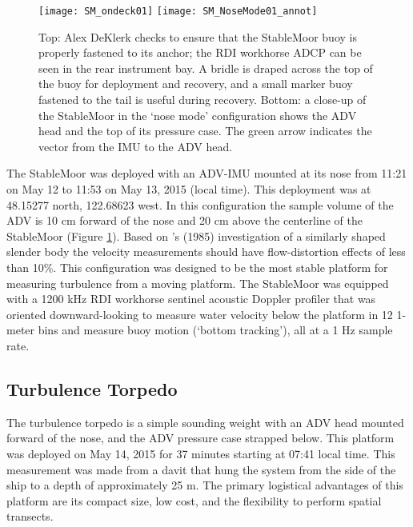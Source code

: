 \begin{figure}[t]
  \centering
  \texttt{[image: SM\_ondeck01]}
  \texttt{[image: SM\_NoseMode01\_annot]}
  \caption{Top: Alex DeKlerk checks to ensure that the StableMoor buoy is properly fastened to its anchor; the RDI workhorse ADCP can be seen in the rear instrument bay. A bridle is draped across the top of the buoy for deployment and recovery, and a small marker buoy fastened to the tail is useful during recovery.  Bottom: a close-up of the StableMoor in the `nose mode' configuration shows the ADV head and the top of its pressure case. The green arrow indicates the vector from the IMU to the ADV head. 
}
  \label{fig:SM}
\end{figure}

The StableMoor was deployed with an ADV-IMU mounted at its nose from 11:21 on May 12 to 11:53 on May 13, 2015 (local time). This deployment was at 48.15277 north, 122.68623 west. In this configuration the sample volume of the ADV is 10 cm forward of the nose and 20 cm above the centerline of the StableMoor (Figure \ref{fig:SM}). Based on \citeauthor{Wyngaard++1985}'s (1985) investigation of a similarly shaped slender body the velocity measurements should have flow-distortion effects of less than 10\%. This configuration was designed to be the most stable platform for measuring turbulence from a moving platform. The StableMoor was equipped with a 1200 kHz RDI workhorse sentinel acoustic Doppler profiler that was oriented downward-looking to measure water velocity below the platform in 12 1-meter bins and measure buoy motion (`bottom tracking'), all at a 1 Hz sample rate. 

\subsection{Turbulence Torpedo}

The turbulence torpedo is a simple sounding weight with an ADV head mounted forward of the nose, and the ADV pressure case strapped below. This platform was deployed on May 14, 2015 for 37 minutes starting at 07:41 local time.  This measurement was made from a davit that hung the system from the side of the ship to a depth of approximately 25 m. The primary logistical advantages of this platform are its compact size, low cost, and the flexibility to perform spatial transects.  

